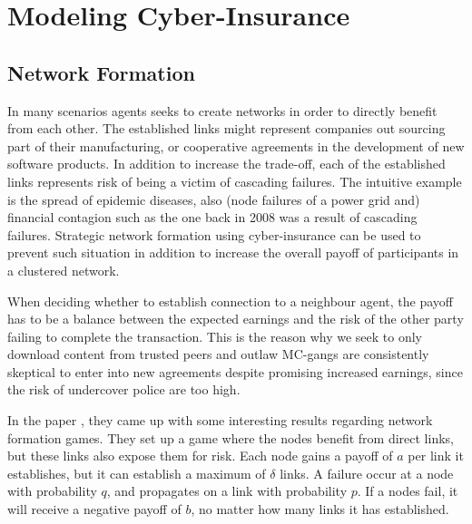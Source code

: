 \chapter{Modeling Cyber-Insurance }
\label{chp:modelingCyberInsurance} 


\section{Network Formation}



In many scenarios agents seeks to create networks in order to directly benefit from each other. The established links might represent companies out sourcing part of their manufacturing, or cooperative agreements in the development of new software products. In addition to increase the trade-off, each of the established links represents risk of being a victim of cascading failures. The intuitive example is the spread of epidemic diseases, also  (node failures of a power grid and) financial contagion such as the one back in 2008 was a result of cascading failures. Strategic network formation using cyber-insurance can be used to prevent such situation in addition to increase the overall payoff of participants in a clustered network.


When deciding whether to establish connection to a neighbour agent, the payoff has to be a balance between the expected earnings and the risk of the other party failing to complete the transaction. This is the reason why we seek to only download content from trusted peers and outlaw MC-gangs are consistently skeptical to enter into new agreements despite promising increased earnings, since the risk of undercover police are too high. 


In the paper \cite{contagion}, they came up with some interesting results regarding network formation games. 
They set up a game where the nodes benefit from direct links, but these links also expose them for risk. 
Each node gains a payoff of  $a$ per link it establishes, but it can establish a maximum of $\delta$ links.
A failure occur at a node with probability $q$, and propagates on a link with probability $p$. If a nodes fail, it will receive a negative payoff of $b$, no matter how many links it has established.


